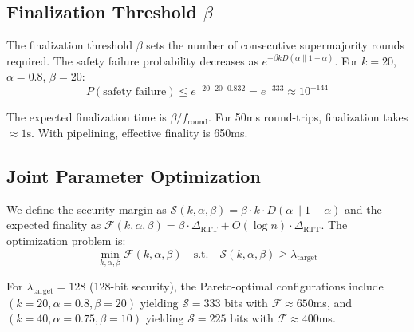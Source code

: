 \subsection{Finalization Threshold $\beta$}

The finalization threshold $\beta$ sets the number of consecutive supermajority rounds
required. The safety failure probability decreases as $e^{-\beta k D(\alpha \| 1-\alpha)}$.
For $k=20$, $\alpha=0.8$, $\beta=20$:
\begin{equation}
P(\text{safety failure}) \leq e^{-20 \cdot 20 \cdot 0.832} = e^{-333} \approx 10^{-144}
\end{equation}

The expected finalization time is $\beta / f_{\text{round}}$. For 50ms round-trips,
finalization takes $\approx 1\text{s}$. With pipelining, effective finality is 650ms.

\subsection{Joint Parameter Optimization}

We define the security margin as $\mathcal{S}(k, \alpha, \beta) = \beta \cdot k \cdot D(\alpha \| 1-\alpha)$
and the expected finality as $\mathcal{F}(k, \alpha, \beta) = \beta \cdot \Delta_{\text{RTT}} + O(\log n) \cdot \Delta_{\text{RTT}}$.
The optimization problem is:
\begin{equation}
\min_{k, \alpha, \beta} \mathcal{F}(k, \alpha, \beta) \quad \text{s.t.} \quad \mathcal{S}(k, \alpha, \beta) \geq \lambda_{\text{target}}
\end{equation}

For $\lambda_{\text{target}} = 128$ (128-bit security), the Pareto-optimal configurations
include $(k=20, \alpha=0.8, \beta=20)$ yielding $\mathcal{S} = 333$ bits with $\mathcal{F} \approx 650$ms, and
$(k=40, \alpha=0.75, \beta=10)$ yielding $\mathcal{S} = 225$ bits with $\mathcal{F} \approx 400$ms.

